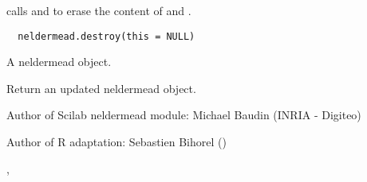 %
\begin{Description}\relax
{} calls  and
 to erase the content of  and
.
\end{Description}
%
\begin{Usage}
\begin{verbatim}
  neldermead.destroy(this = NULL)
\end{verbatim}
\end{Usage}
%
\begin{Arguments}
\begin{ldescription}
\item[\code{this}] A neldermead object.
\end{ldescription}
\end{Arguments}
%
\begin{Value}
Return an updated neldermead object.
\end{Value}
%
\begin{Author}\relax
Author of Scilab neldermead module: Michael Baudin (INRIA - Digiteo)

Author of R adaptation: Sebastien Bihorel ()
\end{Author}
%
\begin{SeeAlso}\relax
{},
\end{SeeAlso}
